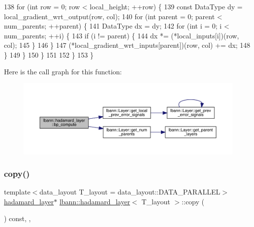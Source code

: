 \begin{DoxyCode}
138         \textcolor{keywordflow}{for} (\textcolor{keywordtype}{int} row = 0; row < local\_height; ++row) \{
139           \textcolor{keyword}{const} DataType dy = local\_gradient\_wrt\_output(row, col);
140           \textcolor{keywordflow}{for} (\textcolor{keywordtype}{int} parent = 0; parent < num\_parents; ++parent) \{
141             DataType dx = dy;
142             \textcolor{keywordflow}{for} (\textcolor{keywordtype}{int} i = 0; i < num\_parents; ++i) \{
143               \textcolor{keywordflow}{if} (i != parent) \{
144                 dx *= (*local\_inputs[i])(row, col);
145               \}
146             \}
147             (*local\_gradient\_wrt\_inputs[parent])(row, col) += dx;
148           \}
149         \}
150       \}
151 
152     \}
153   \}
\end{DoxyCode}
Here is the call graph for this function\+:\nopagebreak
\begin{figure}[H]
\begin{center}
\leavevmode
\includegraphics[width=350pt]{classlbann_1_1hadamard__layer_a2150c54cc21fb5dc51d77119c20c6c21_cgraph}
\end{center}
\end{figure}
\mbox{\label{classlbann_1_1hadamard__layer_ae194aeb83fefa09a45ff4b534839e667}} 
\subsubsection{\texorpdfstring{copy()}{copy()}}
{\footnotesize\ttfamily template$<$data\+\_\+layout T\+\_\+layout = data\+\_\+layout\+::\+D\+A\+T\+A\+\_\+\+P\+A\+R\+A\+L\+L\+EL$>$ \\
\hyperlink{classlbann_1_1hadamard__layer}{hadamard\+\_\+layer}$\ast$ \hyperlink{classlbann_1_1hadamard__layer}{lbann\+::hadamard\+\_\+layer}$<$ T\+\_\+layout $>$\+::copy (\begin{DoxyParamCaption}{ }\end{DoxyParamCaption}) const\hspace{0.3cm}{\ttfamily [inline]}, {\ttfamily [override]}, {\ttfamily [virtual]}}

